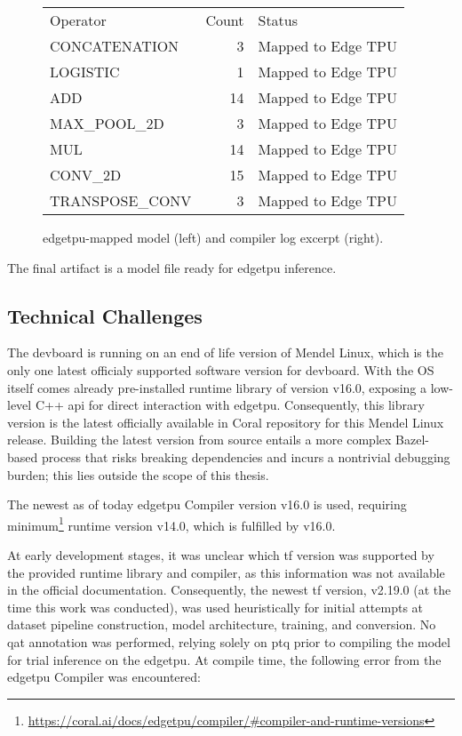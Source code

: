 {\begin{figure}[htbp]
\begin{minipage}[t]{0.74\textwidth}
    \vspace{0.5em}
    \begin{tabular}{@{}lrl@{}}
      Operator & Count & Status \\[0.5em]  %
      CONCATENATION & 3  & Mapped to Edge TPU \\
      LOGISTIC      & 1  & Mapped to Edge TPU \\
      ADD           & 14 & Mapped to Edge TPU \\
      MAX\_POOL\_2D & 3  & Mapped to Edge TPU \\
      MUL           & 14 & Mapped to Edge TPU \\
      CONV\_2D      & 15 & Mapped to Edge TPU \\
      TRANSPOSE\_CONV & 3 & Mapped to Edge TPU
    \end{tabular}
    \vspace*{\fill}        %
\end{minipage}
\caption{\gls{edgetpu}-mapped model (left) and compiler log excerpt (right).}
\label{fig:successcompile}
\end{figure}

The final artifact is a  model file ready for \gls{edgetpu} inference.

\subsection*{Technical Challenges}

The \gls{devboard} is running on an end of life version of Mendel Linux, which is the only one latest officialy supported software version for \gls{devboard}.
With the OS itself comes already pre-installed runtime library  of version v16.0, exposing a low-level C++ \gls{api}
for direct interaction with \gls{edgetpu}. Consequently, this library version is the latest officially available in Coral repository for this Mendel Linux release.
Building the latest version from source entails a more complex Bazel-based process that risks breaking dependencies and incurs a nontrivial debugging burden; 
this lies outside the scope of this thesis.

The newest as of today \gls{edgetpu} Compiler version v16.0 is used,
requiring minimum\footnote{\url{https://coral.ai/docs/edgetpu/compiler/\#compiler-and-runtime-versions}} runtime version v14.0,
which is fulfilled by  v16.0.

At early development stages, it was unclear which \gls{tf} version was supported by the provided runtime library and compiler,
as this information was not available in the official documentation.
Consequently, the newest \gls{tf} version, v2.19.0 (at the time this work was conducted), was used heuristically for initial attempts at dataset pipeline construction,
model architecture, training, and conversion.
No \gls{qat} annotation was performed, relying solely on \gls{ptq} prior to compiling the model for trial inference on the \gls{edgetpu}.
At compile time, the following error from the \gls{edgetpu} Compiler was encountered:

}
